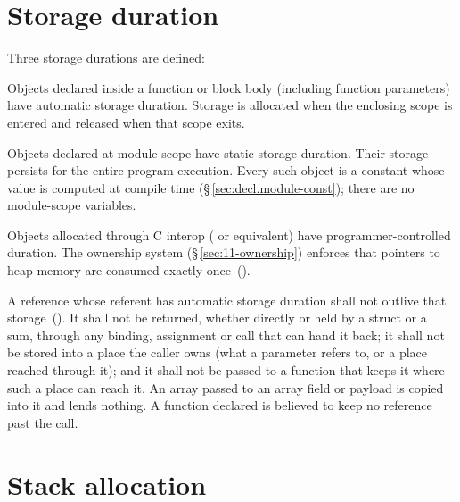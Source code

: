 \section{Storage duration}
\label{sec:mem.storage}

\pnum
Three storage durations are defined:

\begin{description}[leftmargin=2em]
  \item[Automatic duration]
    Objects declared inside a function or block body (including function
    parameters) have automatic storage duration.  Storage is allocated when
    the enclosing scope is entered and released when that scope exits.

  \item[Static duration]
    Objects declared at module scope have static storage duration.  Their
    storage persists for the entire program execution.  Every such object is a
    constant whose value is computed at compile time
    (\S\,\ref{sec:decl.module-const}); there are no module-scope variables.

  \item[Heap (explicit) duration]
    Objects allocated through C interop ( or equivalent)
    have programmer-controlled duration.  The ownership system
    (\S\,\ref{sec:11-ownership}) enforces that  pointers to
    heap memory are consumed exactly once~().
\end{description}

\begin{constraint}
  A reference whose referent has automatic storage duration shall not outlive that
  storage~(). It shall not be returned, whether directly or held by a struct
  or a sum, through any binding, assignment or call that can hand it back; it shall not be
  stored into a place the caller owns (what a  parameter refers to, or a place
  reached through it); and it shall not be passed to a function that keeps it where such a
  place can reach it. An array passed to an array field or payload is copied into it and lends
  nothing. A function declared  is believed to keep no reference past the call.
\end{constraint}

\section{Stack allocation}
\label{sec:mem.stack}


